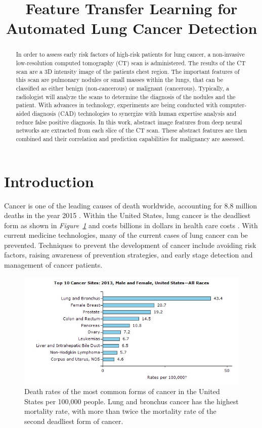 \documentclass[conference,11pt]{IEEEtran}
\title{Feature Transfer Learning for Automated Lung Cancer Detection}
\author{
    \IEEEauthorblockN{Benjamin Hillmann}
    \IEEEauthorblockA{
        \today
    }
}
\begin{document}
\onecolumn
\maketitle

\begin{abstract}
In order to assess early risk factors of high-risk patients for lung cancer, a non-invasive low-resolution computed tomography (CT) scan is administered. The results of the CT scan are a 3D intensity image of the patients chest region. The important features of this scan are pulmonary nodules or small masses within the lungs, that can be classified as either benign (non-cancerous) or malignant (cancerous). Typically, a radiologist will analyze the scans to determine the diagnosis of the nodules and the patient. With advances in technology, experiments are being conducted with computer-aided diagnosis (CAD) technologies to synergize with human expertise analysis and reduce false positive diagnosis. In this work, abstract image features from deep neural networks are extracted from each slice of the CT scan. These abstract features are then combined and their correlation and prediction capabilities for malignancy are assessed.
\end{abstract}

\section{Introduction}

Cancer is one of the leading causes of death worldwide, accounting for 8.8 million deaths in the year 2015 \cite{noauthor_who_nodate}. Within the United States, lung cancer is the deadliest form as shown in \textit{Figure~\ref{fig:cancer}} and costs billions in dollars in health care costs \cite{noauthor_united_nodate}. With current medicine technologies, many of the current cases of lung cancer can be prevented. Techniques to prevent the development of cancer include avoiding risk factors, raising awareness of prevention strategies, and early stage detection and management of cancer patients.

\begin{figure}[hbt]
    \centering
    \includegraphics[width=0.8\linewidth]{figures/plot_top_ten_cancers.jpg}
    \caption{Death rates of the most common forms of cancer in the United States per 100,000 people. Lung and bronchus cancer has the highest mortality rate, with more than twice the mortality rate of the second deadliest form of cancer.}
      \label{fig:cancer}
\end{figure}
\end{document}
